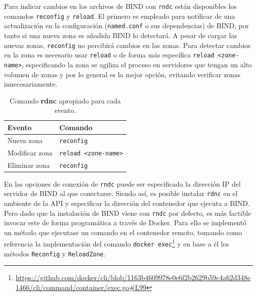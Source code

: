 Para indicar cambios en los archivos de BIND con \verb|rndc| están disponibles los comandos \verb|reconfig| y \verb|reload|. El primero es empleado para notificar de una actualización en la configuración (\verb|named.conf| o sus dependencias) de BIND, por tanto si una nueva zona es añadida BIND lo detectará. A pesar de cargar las nuevas zonas, \verb|reconfig| no percibirá cambios en las zonas. Para detectar cambios en la zona es necesario usar \verb|reload| o de forma más específica \verb|reload <zone-name>|, especificando la zona se agiliza el proceso en servidores que tengan un alto volumen de zonas y por lo general es la mejor opción, evitando verificar zonas innecesariamente.

\begin{table}[!ht]
    \centering
    \begin{tabular}{|l|l|}
    \hline
        \textbf{Evento} & \textbf{Comando} \\ \hline
        Nueva zona & \verb|reconfig| \\ \hline
        Modificar zona & \verb|reload <zone-name>| \\ \hline
        Eliminar zona & \verb|reconfig| \\ \hline
    \end{tabular}
    \caption{Comando \textbf{rdnc} apropiado para cada evento.}
    \label{table:rndc-event}
\end{table}

En las opciones de conexión de \verb|rndc| puede ser especificada la dirección IP del servidor de BIND al que conectarse. Siendo así, es posible instalar \verb|rdnc| en el ambiente de la API y especificar la dirección del contenedor que ejecuta a BIND. Pero dado que la instalación de BIND viene con \verb|rndc| por defecto, es más factible invocar este de forma programática a través de Docker. Para ello se implementó un método que ejecutase un comando en el contenedor remoto, tomando como referencia la implementación del comando \verb|docker exec|\footnote{\url{https://github.com/docker/cli/blob/1163b4609978e0e6f2b2629b59c4a62d348e1466/cli/command/container/exec.go\#L99}} y en base a él los métodos \verb|Reconfig| y \verb|ReloadZone|.


